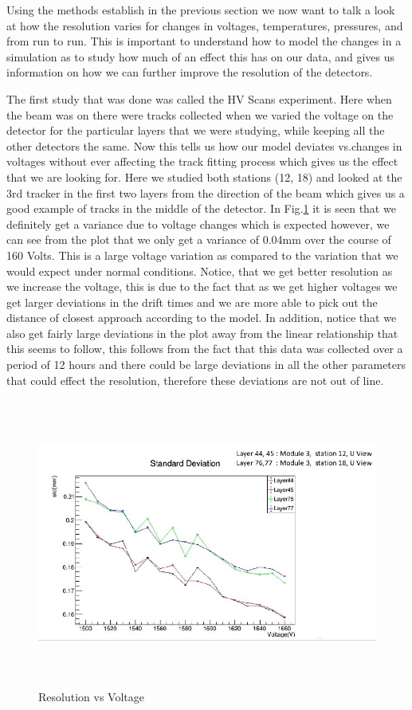 \documentclass[./Thesis]{subfiles}
\begin{document}
	Using the methods establish in the previous section we now want to talk a look at how the resolution varies for changes in voltages, temperatures, pressures, and from run to run. This is important to understand how to model the changes in a simulation as to study how much of an effect this has on our data, and gives us information on how we can further improve the resolution of the detectors.
	
	The first study that was done was called the HV Scans experiment. Here when the beam was on there were tracks collected when we varied the voltage on the detector for the particular layers that we were studying, while keeping all the other detectors the same. Now this tells us how our model deviates vs.changes in voltages without ever affecting the track fitting process which gives us the effect that we are looking for.  Here we studied both stations (12, 18) and looked at the 3rd tracker in the first two layers from the direction of the beam which gives us a good example of tracks in the middle of the detector. In Fig.\ref{fig:ResVolt} it is seen that we definitely get a variance due to voltage changes which is expected however, we can see from the plot that we only get a variance of 0.04mm over the course of 160 Volts. This is a large voltage variation as compared to the variation that we would expect under normal conditions. Notice, that we get better resolution as we increase the voltage, this is due to the fact that as we get higher voltages we get larger deviations in the drift times and we are more able to pick out the distance of closest approach according to the model. In addition, notice that we also get fairly large deviations in the plot away from the linear relationship that this seems to follow, this follows from the fact that this data was collected over a period of 12 hours and there could be large deviations in all the other parameters that could effect the resolution, therefore these deviations are not out of line.

\begin{figure}
	\centerline{\includegraphics[height=95mm]{ResolutionVsVoltage.jpeg}}
	\caption[Resolution Vs Voltage]{ Resolution vs Voltage}
	\label{fig:ResVolt}
\end{figure} 	
\end{document}
